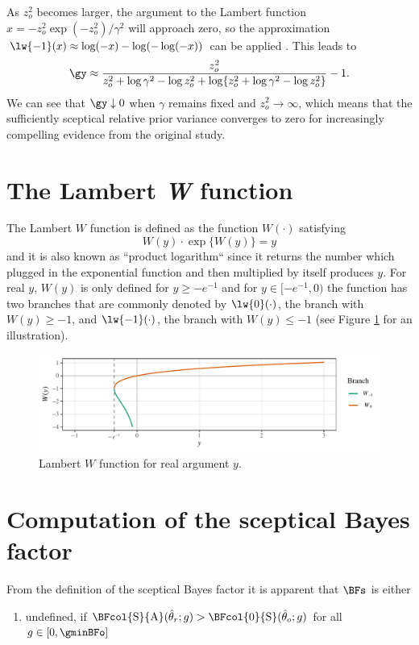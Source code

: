 \begin{subappendices}
As $z_{o}^{2}$ becomes larger, the argument to the Lambert function
$x = -z_{o}^{2}\exp(-z_{o}^{2})/\gamma^{2}$ will approach zero, so the
approximation $\lw{-1}(x) \approx \log(-x) - \log(-\log(-x))$ can be applied
\citep[p. 350]{Corless1996}. This leads to
\begin{align*}
  \gy \approx \frac{z_{o}^{2}}{z_{o}^{2} + \log \gamma^{2} - \log z_{o}^{2} +
  \log\{z_{o}^{2} + \log \gamma^{2} - \log z_{o}^{2}\}} - 1.
\end{align*}
We can see that $\gy \downarrow 0$ when $\gamma$ remains fixed and
$z_{o}^{2} \to \infty$, which means that the sufficiently sceptical relative
prior variance converges to zero for increasingly compelling evidence from the
original study.

\section{The Lambert \textit{W} function}
\label{appendix:lambertW}
The Lambert $W$ function \citep{Corless1996} is defined as the function
$W(\cdot)$ satisfying
$$W(y) \cdot \exp\{W(y)\} = y$$
and it is also known as ``product logarithm`` since it returns the number which
plugged in the exponential function and then multiplied by itself produces $y$.
For real $y$, $W(y)$ is only defined for $y \geq - e^{-1}$ and for
$y \in [-e^{-1}, 0)$ the function has two branches that are commonly denoted by
$\lw{0}(\cdot)$, the branch with $W(y) \geq -1$, and $\lw{-1}(\cdot)$, the
branch with $W(y) \leq -1$ (see Figure \ref{fig2:lambertW} for an illustration).
\begin{figure}[!htb]
\begin{knitrout}
\color{fgcolor}
\includegraphics[width=\maxwidth]{images/paper2/plot-Lambert-1}
\end{knitrout}
\caption{Lambert $W$ function for real argument $y$.}
\label{fig2:lambertW}
\end{figure}


\section{Computation of the sceptical Bayes factor}
\label{appendix:bfs}
From the definition of the sceptical Bayes factor it is apparent that $\BFs$ is
either
\begin{enumerate}
  \item \label{undef} undefined,
  if
  $\BFcol{\text{S}}{\text{A}}(\hat{\theta}_r; g) >
  \BFcol{\text{0}}{\text{S}}(\hat{\theta}_o; g)$ for all $g \in [0,
    \gminBFo]$


\end{enumerate}
\end{subappendices}
